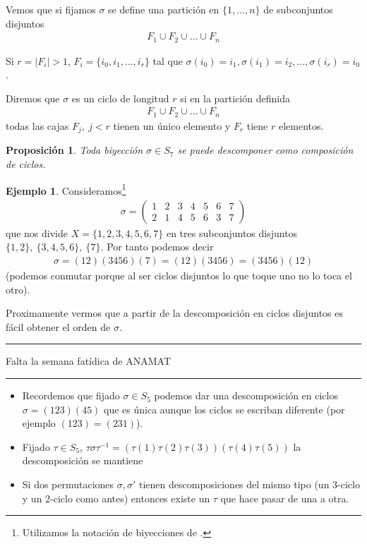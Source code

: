 \documentclass{book}
\newtheorem{pro}{Proposición}
\theoremstyle{definition}
\newtheorem{ej}{Ejemplo}
\theoremstyle{remark}
\newcommand{\inv}[1]{#1^{-1}}
\newcommand{\hr}{\rule{\textwidth}{.4pt}}
\begin{document}
Vemos que si fijamos $\sigma$ se define una partición en $\{1, \dots, n\}$ de subconjuntos disjuntos
\begin{align*}
	F_1 \cup F_2 \cup \dots \cup F_n
\end{align*}

Si $r = |F_i| > 1$, $F_i = \{i_0, i_1, \dots, i_r\}$ tal que $\sigma(i_0) = i_1, \sigma(i_1) = i_2, \dots, \sigma(i_r) = i_0$.

\begin{dfn}[Ciclo]
	\label{dfn:ciclo}
	Diremos que $\sigma$ es un ciclo de longitud $r$ si en la partición definida
	\begin{align*}
	F_1 \cup F_2 \cup \dots \cup F_n
	\end{align*}
	todas las cajas $F_j,\ j < r$ tienen un único elemento y $F_r$ tiene $r$ elementos.
\end{dfn}

\begin{pro}
	Toda biyección $\sigma \in S_7$ se puede descomponer como composición de ciclos.
\end{pro}

\begin{ej}
	Consideramos\footnote{Utilizamos la notación de biyecciones de \cite{dor96}.}
	\begin{align*}
		\sigma = \left(\begin{array}{ccccccc}
		1 & 2 & 3 & 4 & 5 & 6 & 7 \\
		2 & 1 & 4 & 5 & 6 & 3 & 7
		\end{array}\right)
	\end{align*}
	que nos divide $X = \{1, 2, 3, 4, 5, 6, 7\}$ en tres subconjuntos disjuntos $\{1, 2\},\ \{3, 4, 5, 6\},\ \{7\}$. Por tanto podemos decir
	\begin{align*}
		\sigma = (12)(3456)(7) = (12)(3456) = (3456)(12)
	\end{align*}
	(podemos conmutar porque al ser ciclos disjuntos lo que toque uno no lo toca el otro).
\end{ej}

Proximamente vermos que a partir de la descomposición en ciclos disjuntos es fácil obtener el orden de $\sigma$.

\hr

Falta la semana fatídica de ANAMAT\newline
\hr

\begin{itemize}
	\item Recordemos que fijado $\sigma \in S_5$ podemos dar una descomposición en ciclos $\sigma = (123)(45)$ que es única aunque los ciclos se escriban diferente (por ejemplo $(123) = (231)$).

	\item Fijado $\tau \in S_5$, $\tau \sigma \inv{\tau} = (\tau(1)\tau(2)\tau(3))(\tau(4)\tau(5))$ la descomposición se mantiene

	\item Si dos permutaciones $\sigma, \sigma'$ tienen descomposiciones del mismo tipo (un 3-ciclo y un 2-ciclo como antes) entonces existe un $\tau$ que hace pasar de una a otra.
\end{itemize}
\end{document}
